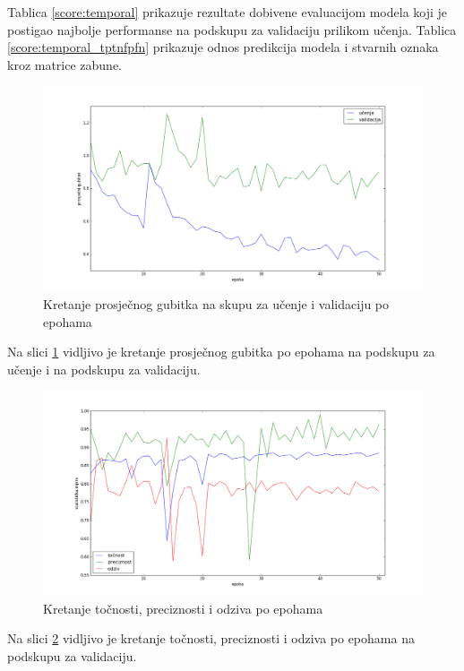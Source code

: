 \documentclass[times, utf8, diplomski, numeric]{fer}
\begin{document}
\noindent Tablica \ref{score:temporal} prikazuje rezultate dobivene evaluacijom modela koji je postigao najbolje performanse na podskupu za validaciju prilikom učenja.
Tablica \ref{score:temporal_tptnfpfn} prikazuje odnos predikcija modela i stvarnih oznaka kroz matrice zabune.

\begin{figure}[H]
\centering
\includegraphics[scale=0.35]{images/temporal_loss.png}
\caption{Kretanje prosječnog gubitka na skupu za učenje i validaciju po epohama}
\label{img:temporal_loss}
\end{figure}
\noindent Na slici \ref{img:temporal_loss} vidljivo je kretanje prosječnog gubitka po epohama na podskupu za učenje i na podskupu za validaciju.

\begin{figure}[H]
\centering
\includegraphics[scale=0.35]{images/temporal_ac_ap.png}
\caption{Kretanje točnosti, preciznosti i odziva po epohama}
\label{img:temporal_ac_ap}
\end{figure}
\noindent Na slici \ref{img:temporal_ac_ap} vidljivo je kretanje točnosti, preciznosti i odziva po epohama na podskupu za validaciju.
\end{document}
